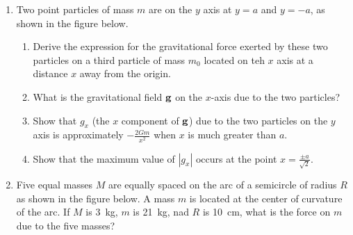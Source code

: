 \documentclass{../../../oss-apphys}
\begin{document}
\begin{enumerate}[leftmargin=15pt]
\item Two point particles of mass $m$ are on the $y$ axis at $y=a$ and $y=-a$,
  as shown in the figure below.
  \begin{center}
  \end{center}
  \begin{enumerate}[noitemsep,leftmargin=20pt]
  \item Derive the expression for the gravitational force exerted by these two
    particles on a third particle of mass $m_0$ located on teh $x$ axis at a
    distance $x$ away from the origin.
  \item What is the gravitational field $\mathbf{g}$ on the $x$-axis due to the
    two particles?
  \item Show that $g_x$ (the $x$ component of $\mathbf{g}$) due to the two
    particles on the $y$ axis is approximately $\displaystyle-\frac{2Gm}{x^2}$
    when $x$ is much greater than $a$.
  \item Show that the maximum value of $|g_x|$ occurs at the point
    $\displaystyle x=\frac{\pm a}{\sqrt{2}}$.
  \end{enumerate}
  \newpage

\item Five equal masses $M$ are equally spaced on the arc of a semicircle of
  radius $R$ as shown in the figure below. A mass $m$ is located at the center
  of curvature of the arc. If $M$ is \SI{3}{\kilo\gram}, $m$ is
  \SI{21}{\kilo\gram}, nad $R$ is \SI{10}{\centi\metre}, what is the force on
  $m$ due to the five masses?
  \begin{center}
  \end{center}
  

\end{enumerate}
\end{document}
